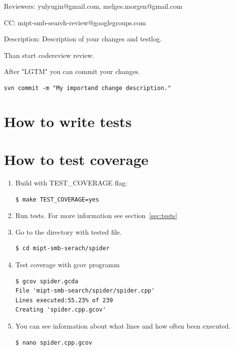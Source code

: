 \documentclass[11pt, oneside, a4paper]{scrartcl}
\begin{document}
Reviewers: yulyugin@gmail.com, melges.morgen@gmail.com

CC: mipt-smb-search-review@googlegroups.com

Description: Description of your changes and testlog.

Than start codereview review.

After "LGTM" you can commit your changes.

\begin{lstlisting}
svn commit -m "My importand change description."
\end{lstlisting}

\section{How to write tests}

\section{How to test coverage}

\begin{enumerate}
  \item Build with TEST\_COVERAGE flag:
\begin{lstlisting}
$ make TEST_COVERAGE=yes
\end{lstlisting}
  \item Run tests. For more information see section~\ref{sec:tests}
  \item Go to the directory with tested file.
\begin{lstlisting}
$ cd mipt-smb-serach/spider
\end{lstlisting}
  \item Test coverage with gcov programm
\begin{lstlisting}
$ gcov spider.gcda
File 'mipt-smb-search/spider/spider.cpp'
Lines executed:55.23% of 239
Creating 'spider.cpp.gcov'
\end{lstlisting}
  \item You can see information about what lines and how often been executed.
\begin{lstlisting}
$ nano spider.cpp.gcov
\end{lstlisting}
\end{enumerate}
\end{document}
